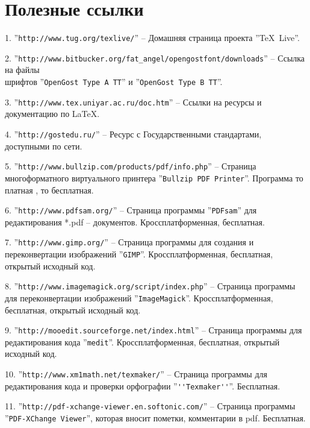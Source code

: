 \section{Полезные ссылки} \label{p:refs}

\par 1. ''\verb"http://www.tug.org/texlive/"'' – Домашняя страница проекта ''\TeX~Live''.
\par 2. ''\verb"http://www.bitbucker.org/fat_angel/opengostfont/downloads"'' – Ссылка на файлы \\ шрифтов ''\verb"OpenGost Type A TT"'' и ''\verb"OpenGost Type B TT"''.
\par 3. ''\verb"http://www.tex.uniyar.ac.ru/doc.htm"'' – Ссылки на ресурсы и документацию по \LaTeX.
\par 4. ''\verb"http://gostedu.ru/"'' – Ресурс с Государственными стандартами, доступными по сети.
\par 5. ''\verb"http://www.bullzip.com/products/pdf/info.php"'' – Страница многоформатного виртуального принтера ''\verb"Bullzip PDF Printer"''. Программа то платная , то бесплатная.
\par 6. ''\verb"http://www.pdfsam.org/"'' – Страница программы  ''\verb"PDFsam"'' для редактирования *.pdf – документов. Кроссплатформенная, бесплатная.
\par 7. ''\verb"http://www.gimp.org/"'' – Страница программы для создания и переконвертации изображений ''\verb"GIMP"''. Кроссплатформенная, бесплатная, открытый исходный код.
\par 8. ''\verb"http://www.imagemagick.org/script/index.php"'' – Страница программы для переконвертации изображений ''\verb"ImageMagick"''. Кроссплатформенная, бесплатная, открытый исходный код.
\par 9. ''\verb"http://mooedit.sourceforge.net/index.html"'' – Страница программы для редактирования кода ''\verb"medit"''. Кроссплатформенная, бесплатная, открытый исходный код.
\par 10. ''\verb"http://www.xm1math.net/texmaker/"'' – Страница программы для редактирования кода и проверки орфографии ''\verb"''Texmaker''"''. Бесплатная.
\par 11. ''\verb"http://pdf-xchange-viewer.en.softonic.com/"'' – Страница программы \\''\verb"PDF-XChange Viewer"'', которая вносит пометки, комментарии в pdf. Бесплатная.


